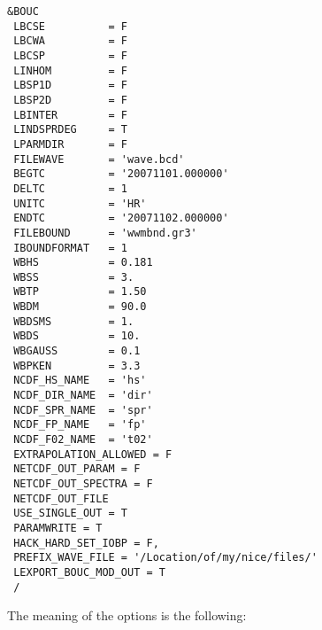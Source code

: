 \documentclass[12pt]{amsart}
\begin{document}
\begin{verbatim}
&BOUC
 LBCSE          = F  
 LBCWA          = F  
 LBCSP          = F  
 LINHOM         = F  
 LBSP1D         = F   
 LBSP2D         = F   
 LBINTER        = F   
 LINDSPRDEG     = T   
 LPARMDIR       = F   
 FILEWAVE       = 'wave.bcd'        
 BEGTC          = '20071101.000000' 
 DELTC          = 1                 
 UNITC          = 'HR'              
 ENDTC          = '20071102.000000'
 FILEBOUND      = 'wwmbnd.gr3'  
 IBOUNDFORMAT   = 1     
 WBHS           = 0.181         
 WBSS           = 3.            
 WBTP           = 1.50         
 WBDM           = 90.0         
 WBDSMS         = 1.           
 WBDS           = 10.          
 WBGAUSS        = 0.1          
 WBPKEN         = 3.3        
 NCDF_HS_NAME   = 'hs'       
 NCDF_DIR_NAME  = 'dir'      
 NCDF_SPR_NAME  = 'spr'      
 NCDF_FP_NAME   = 'fp'       
 NCDF_F02_NAME  = 't02'      
 EXTRAPOLATION_ALLOWED = F
 NETCDF_OUT_PARAM = F   
 NETCDF_OUT_SPECTRA = F 
 NETCDF_OUT_FILE        
 USE_SINGLE_OUT = T  
 PARAMWRITE = T
 HACK_HARD_SET_IOBP = F,
 PREFIX_WAVE_FILE = '/Location/of/my/nice/files/'
 LEXPORT_BOUC_MOD_OUT = T
 /
\end{verbatim}
The meaning of the options is the following:
\end{document}
